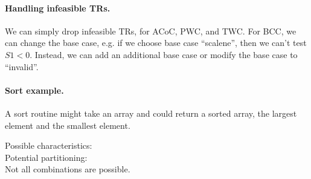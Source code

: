 \documentclass[11pt]{article}
\begin{document}
\paragraph{Handling infeasible TRs.} We can simply drop infeasible TRs,
for ACoC, PWC, and TWC. For BCC, we can change the base case, e.g. if
we choose base case ``scalene'', then we can't test $S1 < 0$. Instead,
we can add an additional base case or modify the base case to
``invalid''.

\paragraph{Sort example.} A sort routine might take an array
and could return a sorted array, the largest element and the smallest
element.

Possible characteristics:\\[5em]

Potential partitioning:\\[5.5em]

Not all combinations are possible.
\end{document}
